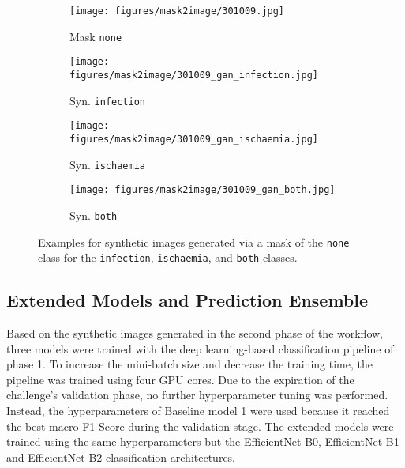 \documentclass[runningheads]{llncs}
\begin{document}
\begin{figure}[ht!]
    \centering
    \begin{subfigure}[b]{0.24\textwidth}
        \centering
        \texttt{[image: figures/mask2image/301009.jpg]}
        \caption{Mask \texttt{none}}
        \label{fig:gan_balance_a}
    \end{subfigure}
    \hfill
    \begin{subfigure}[b]{0.24\textwidth}
        \centering
        \texttt{[image: figures/mask2image/301009\_gan\_infection.jpg]}
        \caption{Syn. \texttt{infection}}
        \label{fig:gan_balance_b}
    \end{subfigure}
    \hfill
    \begin{subfigure}[b]{0.24\textwidth}
        \centering
        \texttt{[image: figures/mask2image/301009\_gan\_ischaemia.jpg]}
        \caption{Syn. \texttt{ischaemia}}
        \label{fig:gan_balance_c}
    \end{subfigure}
    \hfill
    \begin{subfigure}[b]{0.24\textwidth}
        \centering
        \texttt{[image: figures/mask2image/301009\_gan\_both.jpg]}
        \caption{Syn. \texttt{both}}
        \label{fig:gan_balance_d}
    \end{subfigure}
    \caption{Examples for synthetic images generated via a mask of the \texttt{none} class for the \texttt{infection}, \texttt{ischaemia}, and \texttt{both} classes.}
    \label{fig:gan_balance}
\end{figure}





\subsection{Extended Models and Prediction Ensemble} %

Based on the synthetic images generated in the second phase of the workflow, three models were trained with the deep learning-based classification pipeline of phase 1. To increase the mini-batch size and decrease the training time, the pipeline was trained using four GPU cores. Due to the expiration of the challenge's validation phase, no further hyperparameter tuning was performed. Instead, the hyperparameters of Baseline model 1 were used because it reached the best macro F1-Score during the validation stage. The extended models were trained using the same hyperparameters but the EfficientNet-B0, EfficientNet-B1 and EfficientNet-B2 classification architectures. 
\end{document}
